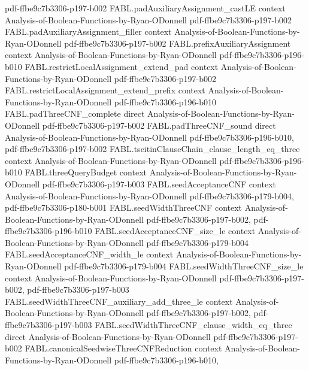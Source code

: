 \begin{theorem}
  {pdf-ffbe9c7b3306-p197-b002}
\proofstep
  {FABL.padAuxiliaryAssignment_castLE}
  {context}
  {Analysis-of-Boolean-Functions-by-Ryan-ODonnell}
  {pdf-ffbe9c7b3306-p197-b002}
\proofstep
  {FABL.padAuxiliaryAssignment_filler}
  {context}
  {Analysis-of-Boolean-Functions-by-Ryan-ODonnell}
  {pdf-ffbe9c7b3306-p197-b002}
\proofstep
  {FABL.prefixAuxiliaryAssignment}
  {context}
  {Analysis-of-Boolean-Functions-by-Ryan-ODonnell}
  {pdf-ffbe9c7b3306-p196-b010}
\proofstep
  {FABL.restrictLocalAssignment_extend_pad}
  {context}
  {Analysis-of-Boolean-Functions-by-Ryan-ODonnell}
  {pdf-ffbe9c7b3306-p197-b002}
\proofstep
  {FABL.restrictLocalAssignment_extend_prefix}
  {context}
  {Analysis-of-Boolean-Functions-by-Ryan-ODonnell}
  {pdf-ffbe9c7b3306-p196-b010}
\proofstep
  {FABL.padThreeCNF_complete}
  {direct}
  {Analysis-of-Boolean-Functions-by-Ryan-ODonnell}
  {pdf-ffbe9c7b3306-p197-b002}
\proofstep
  {FABL.padThreeCNF_sound}
  {direct}
  {Analysis-of-Boolean-Functions-by-Ryan-ODonnell}
  {pdf-ffbe9c7b3306-p196-b010,
    pdf-ffbe9c7b3306-p197-b002}
\proofstep
  {FABL.tseitinClauseChain_clause_length_eq_three}
  {context}
  {Analysis-of-Boolean-Functions-by-Ryan-ODonnell}
  {pdf-ffbe9c7b3306-p196-b010}
\proofstep
  {FABL.threeQueryBudget}
  {context}
  {Analysis-of-Boolean-Functions-by-Ryan-ODonnell}
  {pdf-ffbe9c7b3306-p197-b003}
\proofstep
  {FABL.seedAcceptanceCNF}
  {context}
  {Analysis-of-Boolean-Functions-by-Ryan-ODonnell}
  {pdf-ffbe9c7b3306-p179-b004,
    pdf-ffbe9c7b3306-p180-b001}
\proofstep
  {FABL.seedWidthThreeCNF}
  {context}
  {Analysis-of-Boolean-Functions-by-Ryan-ODonnell}
  {pdf-ffbe9c7b3306-p197-b002,
    pdf-ffbe9c7b3306-p196-b010}
\proofstep
  {FABL.seedAcceptanceCNF_size_le}
  {context}
  {Analysis-of-Boolean-Functions-by-Ryan-ODonnell}
  {pdf-ffbe9c7b3306-p179-b004}
\proofstep
  {FABL.seedAcceptanceCNF_width_le}
  {context}
  {Analysis-of-Boolean-Functions-by-Ryan-ODonnell}
  {pdf-ffbe9c7b3306-p179-b004}
\proofstep
  {FABL.seedWidthThreeCNF_size_le}
  {context}
  {Analysis-of-Boolean-Functions-by-Ryan-ODonnell}
  {pdf-ffbe9c7b3306-p197-b002,
    pdf-ffbe9c7b3306-p197-b003}
\proofstep
  {FABL.seedWidthThreeCNF_auxiliary_add_three_le}
  {context}
  {Analysis-of-Boolean-Functions-by-Ryan-ODonnell}
  {pdf-ffbe9c7b3306-p197-b002,
    pdf-ffbe9c7b3306-p197-b003}
\proofstep
  {FABL.seedWidthThreeCNF_clause_width_eq_three}
  {direct}
  {Analysis-of-Boolean-Functions-by-Ryan-ODonnell}
  {pdf-ffbe9c7b3306-p197-b002}
\proofstep
  {FABL.canonicalSeedwiseThreeCNFReduction}
  {context}
  {Analysis-of-Boolean-Functions-by-Ryan-ODonnell}
  {pdf-ffbe9c7b3306-p196-b010,
}
\end{theorem}
